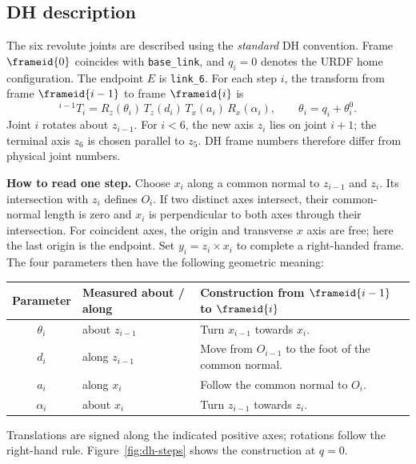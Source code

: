 \subsection{DH description}
\label{sec:dh}

The six revolute joints are described using the \emph{standard} DH convention.
Frame $\frameid{0}$ coincides with \texttt{base\_link}, and $q_i=0$ denotes the
URDF home configuration. The endpoint $E$ is \texttt{link\_6}.
For each step $i$, the transform from frame $\frameid{i-1}$ to frame $\frameid{i}$ is
\begin{equation}
 {}^{i-1}\!T_i
 =R_z(\theta_i)\,T_z(d_i)\,T_x(a_i)\,R_x(\alpha_i),
 \qquad \theta_i=q_i+\theta_i^0 .
 \label{eq:dh-convention}
\end{equation}
Joint $i$ rotates about $z_{i-1}$. For $i<6$, the new axis $z_i$
lies on joint $i+1$; the terminal axis $z_6$ is chosen parallel to $z_5$.
DH frame numbers therefore differ from physical joint numbers.

\textbf{How to read one step.}
Choose $x_i$ along a common normal to $z_{i-1}$ and $z_i$. Its intersection
with $z_i$ defines $O_i$. If two distinct axes intersect, their common-normal length is
zero and $x_i$ is perpendicular to both axes through their intersection.
For coincident axes, the origin and transverse $x$ axis are free; here the last
origin is the endpoint.
Set $y_i=z_i\times x_i$ to complete a right-handed frame. The four parameters
then have the following geometric meaning:
\begin{center}
\small
\begin{tabularx}{\linewidth}{@{}c l X@{}}
\toprule
Parameter & Measured about / along & Construction from $\frameid{i-1}$ to $\frameid{i}$ \\
\midrule
$\theta_i$ & about $z_{i-1}$ & Turn $x_{i-1}$ towards $x_i$. \\
$d_i$ & along $z_{i-1}$ & Move from $O_{i-1}$ to the foot of the common normal. \\
$a_i$ & along $x_i$ & Follow the common normal to $O_i$. \\
$\alpha_i$ & about $x_i$ & Turn $z_{i-1}$ towards $z_i$. \\
\bottomrule
\end{tabularx}
\end{center}
Translations are signed along the indicated positive axes; rotations follow the
right-hand rule. Figure~\ref{fig:dh-steps} shows the construction at $q=0$.

